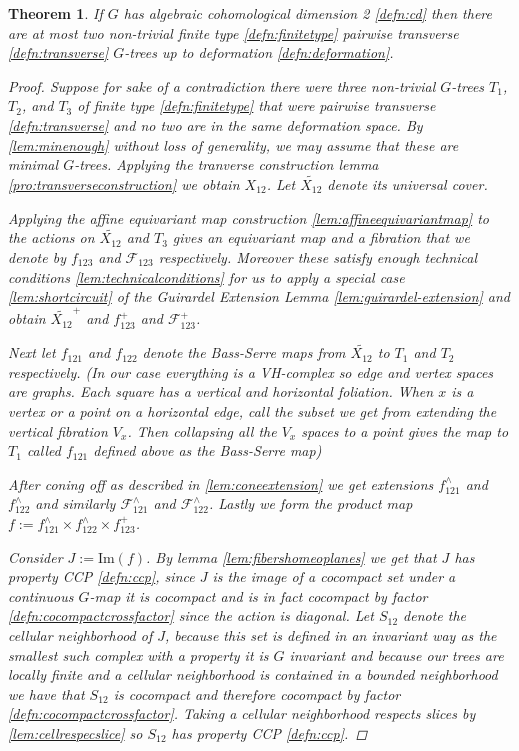 \documentclass{article}
\theoremstyle{mystyle}
\newtheorem{thm}{Theorem}[section]
\theoremstyle{remark}
\begin{document}
\begin{thm}
    If \(G\) has algebraic cohomological dimension 2 \ref{defn:cd}  then there are at most two non-trivial finite type \ref{defn:finitetype} pairwise transverse \ref{defn:transverse} \(G\)-trees up to deformation \ref{defn:deformation}.
    \begin{proof}
        Suppose for sake of a contradiction there were three non-trivial \(G\)-trees \(T_{1}\), \(T_{2}\), and \(T_{3}\) of finite type \ref{defn:finitetype} that were pairwise transverse \ref{defn:transverse} and no two are in the same deformation space. By \ref{lem:minenough} without loss of generality, we may assume that these are minimal \(G\)-trees.  Applying the tranverse construction lemma \ref{pro:transverseconstruction} we obtain \(X_{12}\). Let \(\widetilde {X_{12}}\) denote its universal cover. 
        
        Applying the affine equivariant map construction \ref{lem:affineequivariantmap} to the actions on \(\widetilde {X_{12}}\) and \(T_{3}\) gives an equivariant  map and a fibration that we denote by \(f_{123}\) and \(\mathscr{F}_{123}\) respectively. Moreover these satisfy enough technical conditions \ref{lem:technicalconditions} for us to apply a special case \ref{lem:shortcircuit} of the Guirardel Extension Lemma \ref{lem:guirardel-extension} and obtain \(\widetilde{X_{12}}^{+}\) and \(f_{123}^{+}\) and \(\mathscr{F}_{123}^{+}\).

        Next let  \(f_{121}\) and  \(f_{122}\)  denote the Bass-Serre maps from \(\widetilde {X_{12}}\) to \(T_{1}\) and \(T_{2}\) respectively. (In our case everything is a VH-complex so edge and vertex spaces are graphs. Each square has a vertical and horizontal foliation. When $x$ is a vertex or a point on a horizontal edge, call the subset we get from extending the vertical fibration $V_x$. Then collapsing all the $V_x$ spaces to a point gives the map to $T_1$ called \(f_{121}\) defined above as the Bass-Serre map)
        
        After coning off as described in \ref{lem:coneextension} we get extensions \(f_{121}^{\wedge}\) and \(f_{122}^{\wedge}\) and similarly \(\mathscr{F}^{\wedge}_{121}\) and \(\mathscr{F}^{\wedge}_{122}\). Lastly we form the product map \(f:= f_{121}^{\wedge} \times f_{122}^{\wedge} \times f_{123}^{+}\). 

        Consider \(J := \text{Im}(f)\). By lemma \ref{lem:fibershomeoplanes} we get that \(J\) has property CCP \ref{defn:ccp}, since \(J\) is the image of a cocompact set under a continuous \(G\)-map it is cocompact and is in fact cocompact by factor \ref{defn:cocompactcrossfactor} since the action is diagonal. Let \(S_{12}\) denote the cellular neighborhood of \(J\), because this set is defined in an invariant way as the smallest such complex with a property it is \(G\) invariant and because our trees are locally finite and a cellular neighborhood is contained in a bounded neighborhood we have that \(S_{12}\) is cocompact and therefore cocompact by factor \ref{defn:cocompactcrossfactor}. Taking a cellular neighborhood respects slices by \ref{lem:cellrespecslice}  so \(S_{12}\) has property CCP \ref{defn:ccp}. 


\end{proof}
\end{thm}
\end{document}
